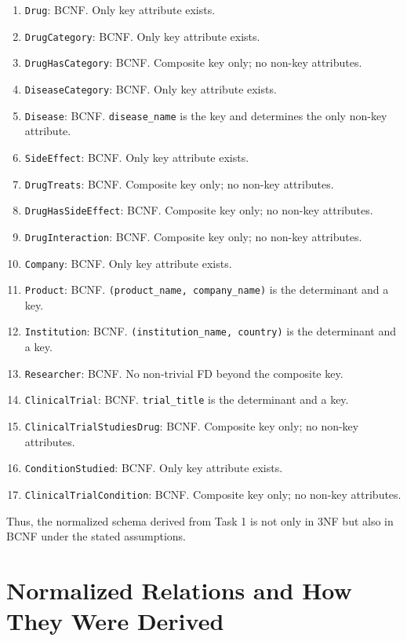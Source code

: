 \documentclass[12pt,a4paper]{article}
\begin{document}
\begin{enumerate}[leftmargin=1.5em]
    \item {\small\texttt{Drug}}: BCNF. Only key attribute exists.
    \item {\small\texttt{DrugCategory}}: BCNF. Only key attribute exists.
    \item {\small\texttt{DrugHasCategory}}: BCNF. Composite key only; no non-key attributes.
    \item {\small\texttt{DiseaseCategory}}: BCNF. Only key attribute exists.
    \item {\small\texttt{Disease}}: BCNF. \texttt{disease\_name} is the key and determines the only non-key attribute.
    \item {\small\texttt{SideEffect}}: BCNF. Only key attribute exists.
    \item {\small\texttt{DrugTreats}}: BCNF. Composite key only; no non-key attributes.
    \item {\small\texttt{DrugHasSideEffect}}: BCNF. Composite key only; no non-key attributes.
    \item {\small\texttt{DrugInteraction}}: BCNF. Composite key only; no non-key attributes.
    \item {\small\texttt{Company}}: BCNF. Only key attribute exists.
    \item {\small\texttt{Product}}: BCNF. \texttt{(product\_name, company\_name)} is the determinant and a key.
    \item {\small\texttt{Institution}}: BCNF. \texttt{(institution\_name, country)} is the determinant and a key.
    \item {\small\texttt{Researcher}}: BCNF. No non-trivial FD beyond the composite key.
    \item {\small\texttt{ClinicalTrial}}: BCNF. \texttt{trial\_title} is the determinant and a key.
    \item {\small\texttt{ClinicalTrialStudiesDrug}}: BCNF. Composite key only; no non-key attributes.
    \item {\small\texttt{ConditionStudied}}: BCNF. Only key attribute exists.
    \item {\small\texttt{ClinicalTrialCondition}}: BCNF. Composite key only; no non-key attributes.
\end{enumerate}

Thus, the normalized schema derived from Task 1 is not only in 3NF but also in BCNF under the
stated assumptions.

\section{Normalized Relations and How They Were Derived}
\end{document}
